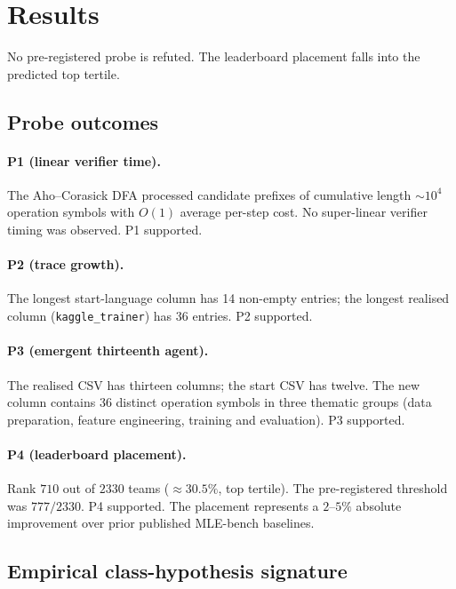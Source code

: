\section{Results}
\label{sec:results}

No pre-registered probe is refuted.  The leaderboard placement falls
into the predicted top tertile.

\subsection{Probe outcomes}

\paragraph{P1 (linear verifier time).}
The Aho--Corasick DFA processed candidate prefixes of cumulative
length $\sim\!10^4$ operation symbols with $O(1)$ average per-step
cost.  No super-linear verifier timing was observed.  P1 supported.

\paragraph{P2 (trace growth).}
The longest start-language column has 14 non-empty entries; the
longest realised column (\texttt{kaggle\_trainer}) has 36 entries.
P2 supported.

\paragraph{P3 (emergent thirteenth agent).}
The realised CSV has thirteen columns; the start CSV has twelve.
The new column contains 36 distinct operation symbols in three
thematic groups (data preparation, feature engineering, training and
evaluation).  P3 supported.

\paragraph{P4 (leaderboard placement).}
Rank $710$ out of $2330$ teams ($\approx\!30.5\%$, top tertile).
The pre-registered threshold was $777/2330$.  P4 supported.
The placement represents a $2$--$5\%$ absolute improvement over
prior published MLE-bench baselines.

\subsection{Empirical class-hypothesis signature}

